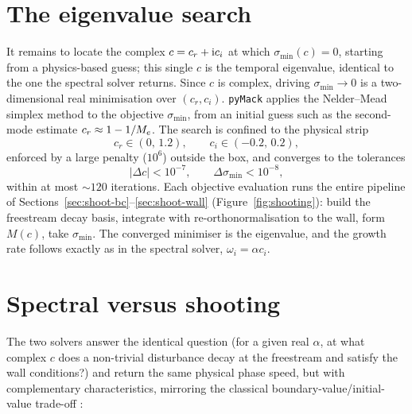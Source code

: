 \documentclass[11pt]{article}
\begin{document}
\section{The eigenvalue search}\label{sec:shoot-search}
It remains to locate the complex $c=c_r+\mathrm{i} c_i$ at which $\sigma_{\min}(c)=0$, starting from a
physics-based guess; this single $c$ is the temporal eigenvalue, identical to the one the spectral
solver returns. Since $c$ is complex, driving $\sigma_{\min}\to0$ is a two-dimensional real
minimisation over $(c_r,c_i)$. \texttt{pyMack} applies the Nelder--Mead simplex method
\cite{neldermead1965} to the objective $\sigma_{\min}$, from an initial guess such as the
second-mode estimate $c_r\approx1-1/M_e$. The search is confined to the physical strip
\begin{equation}\label{eq:bounds}
  c_r\in(0,\,1.2),\qquad c_i\in(-0.2,\,0.2),
\end{equation}
enforced by a large penalty ($10^{6}$) outside the box, and converges to the tolerances
\begin{equation}\label{eq:tols}
  |\Delta c|<10^{-7},\qquad \Delta\sigma_{\min}<10^{-8},
\end{equation}
within at most ${\sim}120$ iterations. Each objective evaluation runs the entire pipeline of
Sections~\ref{sec:shoot-bc}--\ref{sec:shoot-wall} (Figure~\ref{fig:shooting}): build the freestream
decay basis, integrate with re-orthonormalisation to the wall, form $M(c)$, take $\sigma_{\min}$.
The converged minimiser is the eigenvalue, and the growth rate follows exactly as in the spectral
solver, $\omega_i=\alpha c_i$.

\section{Spectral versus shooting}\label{sec:shoot-compare}
The two solvers answer the identical question (for a given real $\alpha$, at what complex $c$ does
a non-trivial disturbance decay at the freestream and satisfy the wall conditions?) and return the
same physical phase speed, but with complementary characteristics, mirroring the classical
boundary-value/initial-value trade-off \cite{malik1990}:
\end{document}
